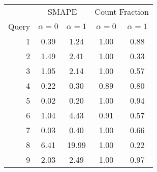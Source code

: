 \begin{tabular}{rcccc}
\toprule
      & \multicolumn{2}{c}{SMAPE}   & \multicolumn{2}{c}{Count Fraction} \\
Query & $\alpha = 0$ & $\alpha = 1$ & $\alpha = 0$ & $\alpha = 1$    \\
\midrule
    1 & 0.39         & 1.24         & 1.00         & 0.88            \\
    2 & 1.49         & 2.41         & 1.00         & 0.33            \\
    3 & 1.05         & 2.14         & 1.00         & 0.57            \\
    4 & 0.22         & 0.30         & 0.89         & 0.80            \\
    5 & 0.02         & 0.20         & 1.00         & 0.94            \\
    6 & 1.04         & 4.43         & 0.91         & 0.57            \\
    7 & 0.03         & 0.40         & 1.00         & 0.66            \\
    8 & 6.41         & 19.99        & 1.00         & 0.22            \\
    9 & 2.03         & 2.49         & 1.00         & 0.97            \\
\bottomrule
\end{tabular}
